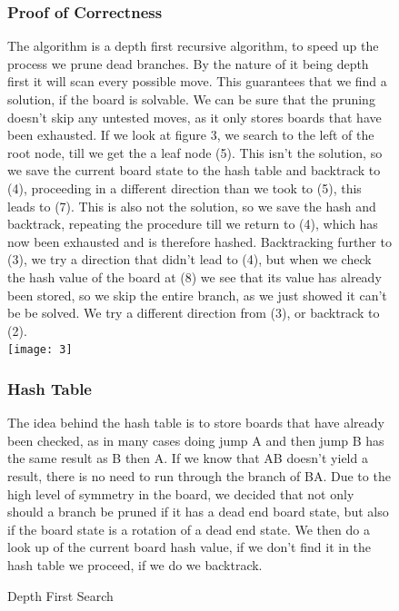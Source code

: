 \documentclass[11pt]{article}
\begin{document}
\begin{figure}
\subsubsection*{Proof of Correctness}
The algorithm is a depth first recursive algorithm, to speed up the process we prune dead branches. By the nature of it being depth first it will scan every possible move. This guarantees that we find a solution, if the board is solvable. We can be sure that the pruning doesn't skip any untested moves, as it only stores boards that have been exhausted.\newline
If we look at figure 3, we search to the left of the root node, till we get the a leaf node (5). This isn't the solution, so we save the current board state to the hash table and backtrack to (4), proceeding in a different direction than we took to (5), this leads to (7). This is also not the solution, so we save the hash and backtrack, repeating the procedure till we return to (4), which has now been exhausted and is therefore hashed. 
Backtracking further to (3), we try a direction that didn't lead to (4), but when we check the hash value of the board at (8) we see that its value has already been stored, so we skip the entire branch, as we just showed it can't be be solved. We try a different direction from (3), or backtrack to (2).
\newline\\
\texttt{[image: 3]}
\caption{Depth First Search} 
\label{fig: 3}
\subsubsection*{Hash Table}
The idea behind the hash table is to store boards that have already been checked, as in many cases doing jump A and then jump B has the same result as B then A. If we know that AB doesn't yield a result, there is no need to run through the branch of BA.
Due to the high level of symmetry in the board, we decided that not only should a branch be pruned if it has a dead end board state, but also if the board state is a rotation of a dead end state. We then do a look up of the current board hash value, if we don't find it in the hash table we proceed, if we do we backtrack.
\end{figure}
\newpage
\end{document}
